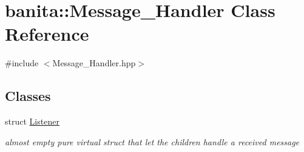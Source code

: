 \hypertarget{classbanita_1_1_message___handler}{}\section{banita\+::Message\+\_\+\+Handler Class Reference}
\label{classbanita_1_1_message___handler}


{\ttfamily \#include $<$Message\+\_\+\+Handler.\+hpp$>$}

\subsection*{Classes}
\begin{DoxyCompactItemize}
\item 
struct \mbox{\hyperlink{structbanita_1_1_message___handler_1_1_listener}{Listener}}
\begin{DoxyCompactList}\small\item\em almost empty pure virtual struct that let the children handle a received message \end{DoxyCompactList}\end{DoxyCompactItemize}
